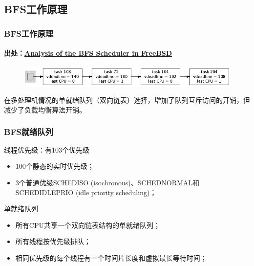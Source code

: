 \subsection{BFS工作原理} %
\begin{frame}[fragile]
    \frametitle{BFS工作原理}
    \framesubtitle{出处：\href{http://vellvisher.github.io/papers_reports/doc/BFS_FreeBSD.pdf}{Analysis of the BFS Scheduler in FreeBSD}}
    \begin{figure}
    \includegraphics[width=1.0\linewidth]{figs/bfs-struct.png}
    \end{figure} \pause

在多处理机情况的单就绪队列（双向链表）选择，增加了队列互斥访问的开销，但减少了负载均衡算法开销。

\end{frame}
% 
% 
% 
% 
% 
% 
% 
\begin{frame}[fragile]
    \frametitle{BFS就绪队列}
    \begin{block}{线程优先级：有103个优先级}
	    \begin{itemize}
	        \item 100个静态的实时优先级；
	        \item 3个普通优级SCHEDISO (isochronous)、SCHEDNORMAL和SCHEDIDLEPRIO (idle priority scheduling)；
	    \end{itemize}
    \end{block} \pause
    \begin{block}{单就绪队列}
	    \begin{itemize}
	        \item 所有CPU共享一个双向链表结构的单就绪队列；
	        \item 所有线程按优先级排队；
	        \item 相同优先级的每个线程有一个时间片长度和虚拟最长等待时间；
	    \end{itemize}
    \end{block}
\end{frame}
